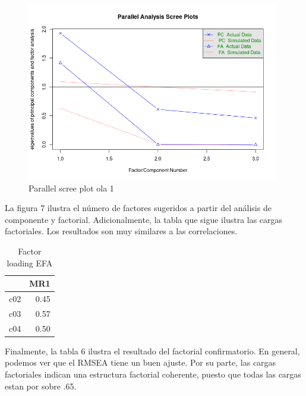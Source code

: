 \begin{figure}[H]
    \centering
    \includegraphics[width=11cm]{output/scree_plots1.png}
    \caption{Parallel scree plot ola 1}
    \label{fig:scree1}
\end{figure}

La figura 7 ilustra el número de factores sugeridos a partir del análisis de componente y factorial. Adicionalmente, la tabla que sigue ilustra las cargas factoriales. Los resultados son muy similares a las correlaciones. 


\begin{table}[H]
\centering
\caption{Factor loading EFA}
\begin{tabular}{rr}
  \hline
 & MR1 \\ 
  \hline
c02 & 0.45 \\ 
  c03 & 0.57 \\ 
  c04 & 0.50 \\ 
   \hline
\end{tabular}
\end{table}

Finalmente, la tabla 6 ilustra el resultado del factorial confirmatorio. En general, podemos ver que el RMSEA tiene un buen ajuste. Por su parte, las cargas factoriales indican una estructura factorial coherente, puesto que todas las cargas estan por sobre .65. 



